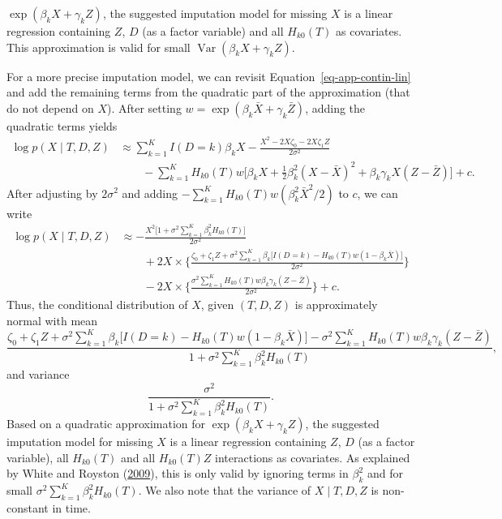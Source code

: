 \documentclass[
  letterpaper,
  DIV=11,
  numbers=noendperiod]{scrreprt}
\DeclareMathOperator{\Var}{Var}
\begin{document}
\(\exp(\beta_k X + \gamma_k Z)\), the suggested imputation model for
missing \(X\) is a linear regression containing \(Z\), \(D\) (as a
factor variable) and all \(H_{k0}(T)\) as covariates. This approximation
is valid for small \(\Var(\beta_k X + \gamma_k Z)\).

For a more precise imputation model, we can revisit
Equation~\ref{eq-app-contin-lin} and add the remaining terms from the
quadratic part of the approximation (that do not depend on \(X\)). After
setting \(w = \exp(\beta_k \bar{X} + \gamma_k \bar{Z})\), adding the
quadratic terms yields \begin{align*}
    \log p(X \mid T, D, Z) &\approx \sum^K_{k = 1} I(D=k) \beta_k X - \frac{X^2 - 2X\zeta_0 - 2X\zeta_1 Z}{2\sigma^2} \\
    &\qquad - \sum^K_{k = 1} H_{k0}(T) w \bigg[ \beta_k X + \frac{1}{2} \beta_k^2(X - \bar{X})^2 + \beta_k \gamma_k X (Z - \bar{Z}) \bigg] + c.
\end{align*} After adjusting by \(2\sigma^2\) and adding
\(- \sum^K_{k = 1} H_{k0}(T) w(\beta^2_k\bar{X}^2/2)\) to \(c\), we can
write \begin{align*}
    \log p(X \mid T, D, Z) &\approx -\frac{X^2\big[1 + \sigma^2 \sum^K_{k = 1} \beta_k^2  H_{k0}(T)\big]}{2\sigma^2} \\
    &\qquad + 2X \times \Biggl\{ \frac{\zeta_0 + \zeta_1 Z +  \sigma^2 \sum^K_{k = 1} \beta_k \big[ I(D=k) - H_{k0}(T)w(1 - \beta_k \bar{X}) \big]}{2\sigma^2} \Biggr\} \\
    &\qquad - 2X \times \Biggl\{ \frac{\sigma^2\sum^K_{k = 1}H_{k0}(T)w \beta_k \gamma_k(Z - \bar{Z})}{2\sigma^2}\Biggr\} + c.
\end{align*} Thus, the conditional distribution of \(X\), given
\((T, D, Z)\) is approximately normal with mean \begin{equation*}
    \frac{\zeta_0 + \zeta_1 Z +  \sigma^2 \sum^K_{k = 1} \beta_k \big[ I(D=k) - H_{k0}(T)w(1 - \beta_k \bar{X}) \big] - \sigma^2\sum^K_{k = 1}H_{k0}(T)w \beta_k \gamma_k(Z - \bar{Z})}{1 + \sigma^2 \sum^K_{k = 1} \beta_k^2  H_{k0}(T)},
\end{equation*} and variance \begin{equation*}
    \frac{\sigma^2}{1 + \sigma^2 \sum^K_{k = 1} \beta_k^2  H_{k0}(T)}.
\end{equation*} Based on a quadratic approximation for
\(\exp(\beta_k X + \gamma_k Z)\), the suggested imputation model for
missing \(X\) is a linear regression containing \(Z\), \(D\) (as a
factor variable), all \(H_{k0}(T)\) and all \(H_{k0}(T)Z\) interactions
as covariates. As explained by White and Royston
(\protect\hyperlink{ref-whiteImputingMissingCovariate2009}{2009}), this
is only valid by ignoring terms in \(\beta^2_k\) and for small
\(\sigma^2 \sum^K_{k = 1} \beta_k^2 H_{k0}(T)\). We also note that the
variance of \(X \mid T, D, Z\) is non-constant in time.
\end{document}
